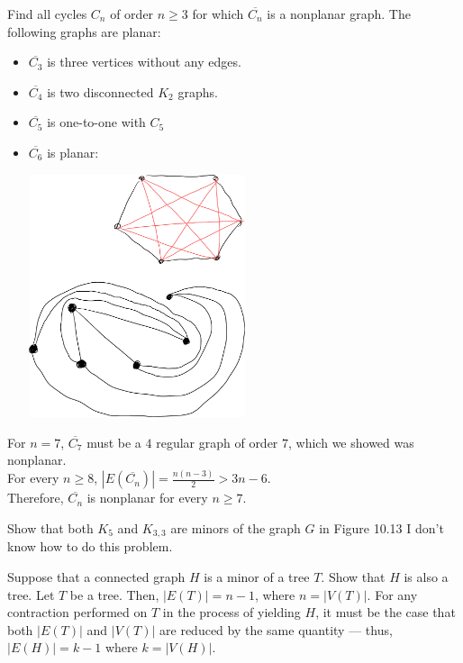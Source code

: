 \documentclass[10pt]{extarticle}
\begin{document}
  \begin{problem}{8}
    Find all cycles $C_n$ of order $n\geq 3$ for which $\overline{C_n}$ is a nonplanar graph.
    \tcblower
    The following graphs are planar:
    \begin{itemize}
      \item $\overline{C_3}$ is three vertices without any edges.
      \item $\overline{C_4}$ is two disconnected $K_2$ graphs.
      \item $\overline{C_5}$ is one-to-one with $C_5$
      \item $\overline{C_6}$ is planar:
        \begin{center}
          \includegraphics[width=0.5\textwidth]{images/10_8_sol.png}
        \end{center}
    \end{itemize}
    For $n = 7$, $ \overline{C_7} $ must be a $4$ regular graph of order $7$, which we showed was nonplanar.\\

    For every $n\geq 8$, $|E(\overline{C_n})| = \frac{n(n-3)}{2} > 3n-6$.\\

    Therefore, $\overline{C_n}$ is nonplanar for every $n\geq 7$.
  \end{problem}
  \begin{problem}{18}
    Show that both $K_{5}$ and $K_{3,3}$ are minors of the graph $G$ in Figure 10.13
    \tcblower
    I don't know how to do this problem.
  \end{problem}
  \begin{problem}{19}
    Suppose that a connected graph $H$ is a minor of a tree $T$. Show that $H$ is also a tree.
    \tcblower
    Let $T$ be a tree. Then, $|E(T)| = n-1$, where $n = |V(T)|$. For any contraction performed on $T$ in the process of yielding $H$, it must be the case that both $|E(T)|$ and $|V(T)|$ are reduced by the same quantity --- thus, $|E(H)| = k-1$ where $k = |V(H)|$.
  \end{problem}
\end{document}
